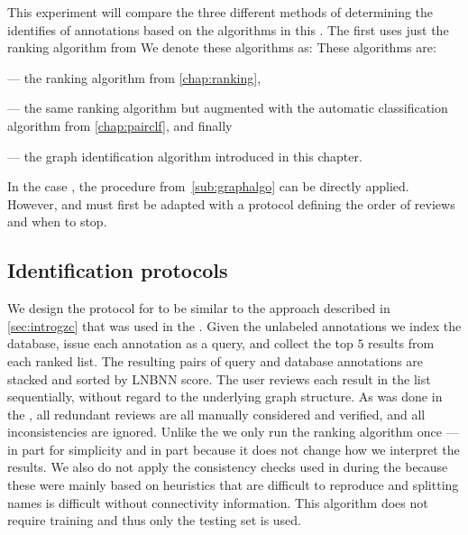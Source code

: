     This experiment will compare the three different methods of determining the identifies of annotations based
      on the algorithms in this \thesis{}.
    The first uses just the ranking algorithm from 
    We denote these algorithms as:
    These algorithms are:
    \begin{enumin}

    \item {} --- the ranking algorithm from \cref{chap:ranking}, 

    \item {} --- the same
        ranking algorithm but augmented with the automatic classification algorithm from \cref{chap:pairclf}, and
        finally

    \item {} --- the graph identification algorithm introduced in this chapter.

    \end{enumin}
    In the case , the procedure from~\cref{sub:graphalgo} can be directly applied.
    However,  and  must first be adapted with a protocol defining the order of
      reviews and when to stop.

    \subsection{Identification protocols}

    We design the protocol for  to be similar to the approach described in \cref{sec:introgzc} that
      was used in the \GZC{}.
    Given the unlabeled annotations we index the database, issue each annotation as a query, and collect the top
      $5$ results from each ranked list.
    The resulting pairs of query and database annotations are stacked and sorted by LNBNN score.
    The user reviews each result in the list sequentially, without regard to the underlying graph structure.
    As was done in the \GZC{}, all redundant reviews are all manually considered and verified, and all
      inconsistencies are ignored.
    Unlike the \GZC{} we only run the ranking algorithm once --- in part for simplicity and in part because it
      does not change how we interpret the results.
    We also do not apply the consistency checks used in during the \GZC{} because these were mainly based on
      heuristics that are difficult to reproduce and splitting names is difficult without connectivity information.
    This algorithm does not require training and thus only the testing set is used.

